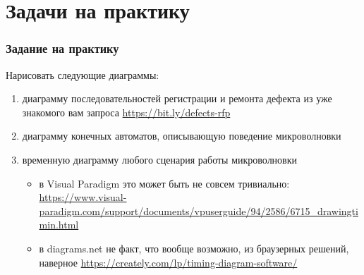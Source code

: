 \documentclass{../mcsslides}
\begin{document}
    \begin{frame}[plain]
        \titlepage
    \end{frame}

    \section{Задачи на практику}

    \begin{frame}
        \frametitle{Задание на практику}
        Нарисовать следующие диаграммы:
        \begin{enumerate}
            \item диаграмму последовательностей регистрации и ремонта дефекта из уже знакомого вам запроса \url{https://bit.ly/defects-rfp}
            \item диаграмму конечных автоматов, описывающую поведение микроволновки
            \item временную диаграмму любого сценария работы микроволновки
            \begin{itemize}
                \item в Visual Paradigm это может быть не совсем тривиально: \url{https://www.visual-paradigm.com/support/documents/vpuserguide/94/2586/6715_drawingtimin.html}
                \item в diagrams.net не факт, что вообще возможно, из браузерных решений, наверное \url{https://creately.com/lp/timing-diagram-software/}
            \end{itemize}
        \end{enumerate}
    \end{frame}
\end{document}
